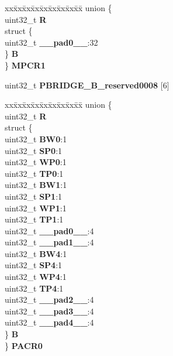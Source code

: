 \begin{DoxyCompactItemize}
\begin{tabbing}
\end{tabbing}\item 
\mbox{\label{structPBRIDGE__B__tag_ab38863a0f6b8d7dfc4ea2aaed6df35b4}} 
\begin{tabbing}
xx\=xx\=xx\=xx\=xx\=xx\=xx\=xx\=xx\=\kill
union \{\\
\>uint32\_t {\bfseries R}\\
\>struct \{\\
\>\>uint32\_t {\bfseries \_\_pad0\_\_}:32\\
\>\} {\bfseries B}\\
\} {\bfseries MPCR1}\\

\end{tabbing}\item 
\mbox{\label{structPBRIDGE__B__tag_ac627cfa26089e7df7caf7d165624ce92}} 
uint32\+\_\+t {\bfseries P\+B\+R\+I\+D\+G\+E\+\_\+\+B\+\_\+reserved0008} \mbox{[}6\mbox{]}
\item 
\mbox{\label{structPBRIDGE__B__tag_ae46d5f6c761f39f9351a8d9d7ba77780}} 
\begin{tabbing}
xx\=xx\=xx\=xx\=xx\=xx\=xx\=xx\=xx\=\kill
union \{\\
\>uint32\_t {\bfseries R}\\
\>struct \{\\
\>\>uint32\_t {\bfseries BW0}:1\\
\>\>uint32\_t {\bfseries SP0}:1\\
\>\>uint32\_t {\bfseries WP0}:1\\
\>\>uint32\_t {\bfseries TP0}:1\\
\>\>uint32\_t {\bfseries BW1}:1\\
\>\>uint32\_t {\bfseries SP1}:1\\
\>\>uint32\_t {\bfseries WP1}:1\\
\>\>uint32\_t {\bfseries TP1}:1\\
\>\>uint32\_t {\bfseries \_\_pad0\_\_}:4\\
\>\>uint32\_t {\bfseries \_\_pad1\_\_}:4\\
\>\>uint32\_t {\bfseries BW4}:1\\
\>\>uint32\_t {\bfseries SP4}:1\\
\>\>uint32\_t {\bfseries WP4}:1\\
\>\>uint32\_t {\bfseries TP4}:1\\
\>\>uint32\_t {\bfseries \_\_pad2\_\_}:4\\
\>\>uint32\_t {\bfseries \_\_pad3\_\_}:4\\
\>\>uint32\_t {\bfseries \_\_pad4\_\_}:4\\
\>\} {\bfseries B}\\
\} {\bfseries PACR0}\\


\end{tabbing}
\end{DoxyCompactItemize}
